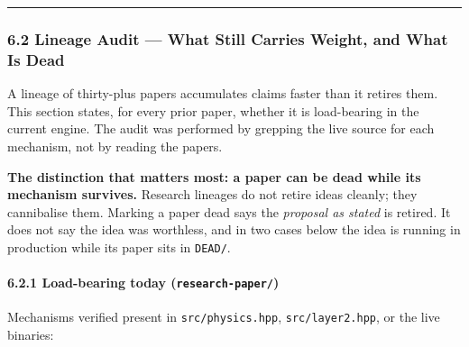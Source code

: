 \documentclass[
  11pt,
  a4paper,
]{article}
\begin{document}
\begin{center}\rule{0.5\linewidth}{0.5pt}\end{center}

\subsubsection{6.2 Lineage Audit --- What Still Carries Weight, and What
Is Dead}\label{lineage-audit-what-still-carries-weight-and-what-is-dead}

A lineage of thirty-plus papers accumulates claims faster than it
retires them. This section states, for every prior paper, whether it is
load-bearing in the current engine. The audit was performed by grepping
the live source for each mechanism, not by reading the papers.

\textbf{The distinction that matters most: a paper can be dead while its
mechanism survives.} Research lineages do not retire ideas cleanly; they
cannibalise them. Marking a paper dead says the \emph{proposal as
stated} is retired. It does not say the idea was worthless, and in two
cases below the idea is running in production while its paper sits in
\texttt{DEAD/}.

\paragraph{\texorpdfstring{6.2.1 Load-bearing today
(\texttt{research-paper/})}{6.2.1 Load-bearing today (research-paper/)}}\label{load-bearing-today-research-paper}

Mechanisms verified present in \texttt{src/physics.hpp},
\texttt{src/layer2.hpp}, or the live binaries:
\end{document}

